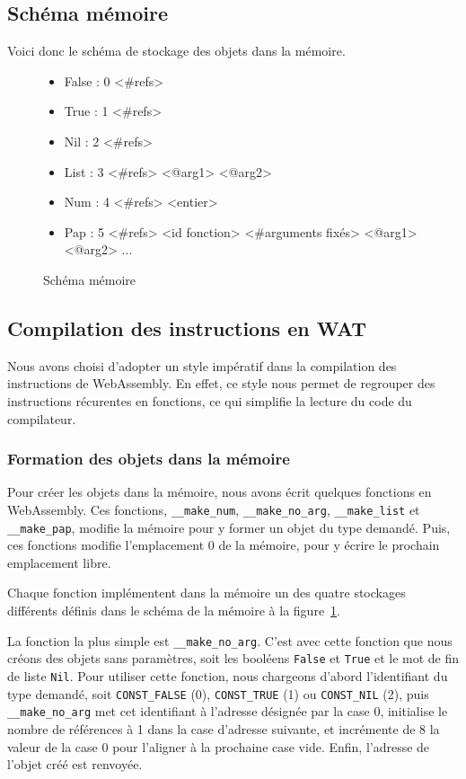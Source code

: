 \documentclass{rapportECL}
\begin{document}
\subsection{Schéma mémoire}

Voici donc le schéma de stockage des objets dans la mémoire.


\begin{figure}[H]
	\begin{itemize}
		\item False : 0 <\#refs>
		\item True  : 1 <\#refs>
		\item Nil   : 2 <\#refs>
		\item List  : 3 <\#refs> <@arg1> <@arg2>
		\item Num   : 4 <\#refs> <entier>
		\item Pap   : 5 <\#refs> <id fonction> <\#arguments fixés> <@arg1> <@arg2> ...
	\end{itemize}
	\caption{Schéma mémoire}
	\label{listing:memory_wasm}
\end{figure}

\subsection{Compilation des instructions en WAT}

Nous avons choisi d'adopter un style impératif dans la compilation des instructions de WebAssembly. En effet, ce style nous permet 
de regrouper des instructions récurentes en fonctions, ce qui simplifie la lecture du code du compilateur.

\subsubsection{Formation des objets dans la mémoire}

Pour créer les objets dans la mémoire, nous avons écrit quelques fonctions en WebAssembly.
Ces fonctions, \verb|__make_num|, \verb|__make_no_arg|, \verb|__make_list| et \verb|__make_pap|, modifie la mémoire
pour y former un objet du type demandé. Puis, ces fonctions modifie l'emplacement 0 de la mémoire, pour y écrire le
prochain emplacement libre. 

Chaque fonction implémentent dans la mémoire un des quatre stockages différents définis dans le schéma de la 
mémoire à la figure~\ref{listing:memory_wasm}.

\bigskip

La fonction la plus simple est \verb|__make_no_arg|. C'est avec cette fonction que nous créons des objets sans paramètres,
soit les booléens \verb|False| et \verb|True| et le mot de fin de liste \verb|Nil|. Pour utiliser cette fonction,
nous chargeons d'abord l'identifiant du type demandé, soit \verb|CONST_FALSE| (0), \verb|CONST_TRUE| (1) ou \verb|CONST_NIL| (2),
puis \verb|__make_no_arg| met cet identifiant à l'adresse désignée par la case 0, initialise le nombre de références à 1 dans la
case d'adresse suivante, et incrémente de 8 la valeur de la case 0 pour l'aligner à la prochaine case vide. 
Enfin, l'adresse de l'objet créé est renvoyée.
\end{document}
